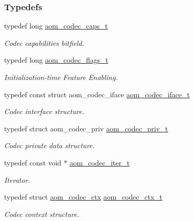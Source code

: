 \subsubsection*{Typedefs}
\begin{DoxyCompactItemize}
\item 
typedef long \hyperlink{group__codec_ga019a4c05cd929e7c50133f6b536eeabf}{aom\+\_\+codec\+\_\+caps\+\_\+t}
\begin{DoxyCompactList}\small\item\em Codec capabilities bitfield. \end{DoxyCompactList}\item 
typedef long \hyperlink{group__codec_ga18f2242c1afca329581fbd3f2c81721b}{aom\+\_\+codec\+\_\+flags\+\_\+t}
\begin{DoxyCompactList}\small\item\em Initialization-\/time Feature Enabling. \end{DoxyCompactList}\item 
typedef const struct aom\+\_\+codec\+\_\+iface \hyperlink{group__codec_ga4ef55b44c762836d1550e11921bed403}{aom\+\_\+codec\+\_\+iface\+\_\+t}
\begin{DoxyCompactList}\small\item\em Codec interface structure. \end{DoxyCompactList}\item 
typedef struct aom\+\_\+codec\+\_\+priv \hyperlink{group__codec_ga3671963ca4b3d6c2adbc186c8ed18023}{aom\+\_\+codec\+\_\+priv\+\_\+t}
\begin{DoxyCompactList}\small\item\em Codec private data structure. \end{DoxyCompactList}\item 
typedef const void $\ast$ \hyperlink{group__codec_gadf9e173c9e02788a9999399edab20a02}{aom\+\_\+codec\+\_\+iter\+\_\+t}
\begin{DoxyCompactList}\small\item\em Iterator. \end{DoxyCompactList}\item 
typedef struct \hyperlink{structaom__codec__ctx}{aom\+\_\+codec\+\_\+ctx} \hyperlink{group__codec_ga9a1d27f9742d9f70783e3c6cb849b5b4}{aom\+\_\+codec\+\_\+ctx\+\_\+t}
\begin{DoxyCompactList}\small\item\em Codec context structure. \end{DoxyCompactList}\item 
\mbox{\label{group__codec_ga90c2026e798a669241dc57464472a198}} 

\end{DoxyCompactItemize}
